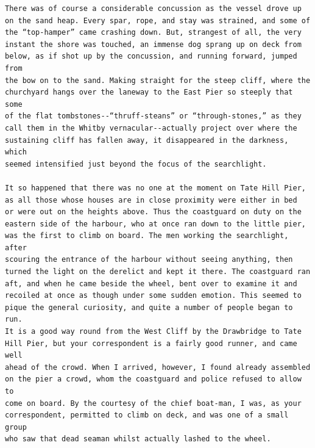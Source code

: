 \documentclass{article}
\begin{document}
\begin{verbatim}
There was of course a considerable concussion as the vessel drove up
on the sand heap. Every spar, rope, and stay was strained, and some of
the “top-hamper” came crashing down. But, strangest of all, the very
instant the shore was touched, an immense dog sprang up on deck from
below, as if shot up by the concussion, and running forward, jumped from
the bow on to the sand. Making straight for the steep cliff, where the
churchyard hangs over the laneway to the East Pier so steeply that some
of the flat tombstones--“thruff-steans” or “through-stones,” as they
call them in the Whitby vernacular--actually project over where the
sustaining cliff has fallen away, it disappeared in the darkness, which
seemed intensified just beyond the focus of the searchlight.

It so happened that there was no one at the moment on Tate Hill Pier,
as all those whose houses are in close proximity were either in bed
or were out on the heights above. Thus the coastguard on duty on the
eastern side of the harbour, who at once ran down to the little pier,
was the first to climb on board. The men working the searchlight, after
scouring the entrance of the harbour without seeing anything, then
turned the light on the derelict and kept it there. The coastguard ran
aft, and when he came beside the wheel, bent over to examine it and
recoiled at once as though under some sudden emotion. This seemed to
pique the general curiosity, and quite a number of people began to run.
It is a good way round from the West Cliff by the Drawbridge to Tate
Hill Pier, but your correspondent is a fairly good runner, and came well
ahead of the crowd. When I arrived, however, I found already assembled
on the pier a crowd, whom the coastguard and police refused to allow to
come on board. By the courtesy of the chief boat-man, I was, as your
correspondent, permitted to climb on deck, and was one of a small group
who saw that dead seaman whilst actually lashed to the wheel.


\end{verbatim}
\end{document}
